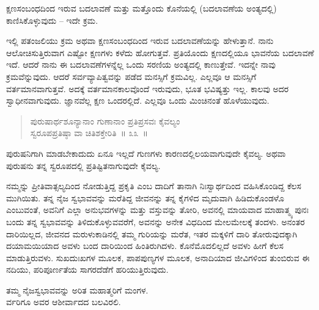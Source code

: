 ಕ್ಷಣಸಂಬಂಧದಿಂದ ಇರುವ ಬದಲಾವಣೆ ಮತ್ತು ಮತ್ತೊಂದು ಕೊನೆಯಲ್ಲಿ (ಬದಲಾವಣೆಯ ಅಂತ್ಯದಲ್ಲಿ) ಕಾಣಿಸಿಕೊಳ್ಳುವುದು – ಇದೇ ಕ್ರಮ. 

ಇಲ್ಲಿ ಪತಂಜಲಿಯು ಕ್ರಮ ಅಥವಾ ಕ್ಷಣಸಂಬಂಧದಿಂದ ಇರುವ ಬದಲಾವಣೆಯನ್ನು ಹೇಳುತ್ತಾನೆ. ನಾನು ಆಲೋಚಿಸುತ್ತಿರುವಾಗ ಎಷ್ಟೋ ಕ್ಷಣಗಳು ಕಳೆದು ಹೋಗುತ್ತವೆ. ಪ್ರತಿಯೊಂದು ಕ್ಷಣದಲ್ಲಿಯೂ ಭಾವನೆಯ ಬದಲಾವಣೆ ಇದೆ. ಆದರೆ ನಾನು ಈ ಬದಲಾವಣೆಗಳನ್ನೆಲ್ಲ ಒಂದು ಸರಣಿಯ ಅಂತ್ಯದಲ್ಲಿ ಕಾಣುತ್ತೇವೆ. ಇದನ್ನೇ ನಾವು ಕ್ರಮವೆನ್ನುವುದು. ಆದರೆ ಸರ್ವವ್ಯಾಪಿತ್ವವನ್ನು ಪಡೆದ ಮನಸ್ಸಿಗೆ ಕ್ರಮವಿಲ್ಲ. ಎಲ್ಲವೂ ಆ ಮನಸ್ಸಿಗೆ ವರ್ತಮಾನವಾಗುತ್ತವೆ. ಅದಕ್ಕೆ ವರ್ತಮಾನಕಾಲವೊಂದೆ ಇರುವುದು, ಭೂತ ಭವಿಷ್ಯತ್ತು ಇಲ್ಲ. ಕಾಲವು ಅದರ ಸ್ವಾಧೀನವಾಗುವುದು. ಜ್ಞಾನವೆಲ್ಲ ಕ್ಷಣ ಒಂದರಲ್ಲಿದೆ. ಎಲ್ಲವೂ ಒಂದು ಮಿಂಚಿನಂತೆ ಹೊಳೆಯುವುದು.

\begin{verse}
ಪುರುಷಾರ್ಥಶೂನ್ಯಾನಾಂ ಗುಣಾನಾಂ ಪ್ರತಿಪ್ರಸವಃ ಕೈವಲ್ಯಂ \\ಸ್ವರೂಪಪ್ರತಿಷ್ಠಾ ವಾ ಚಿತಿಶಕ್ತೇರಿತಿ~॥ ೩೩~॥
\end{verse}

ಪುರುಷನಿಗಾಗಿ ಮಾಡಬೇಕಾದುದು ಏನೂ ಇಲ್ಲದೆ ಗುಣಗಳು ಕಾರಣದಲ್ಲಿಲಯವಾಗುವುದೇ ಕೈವಲ್ಯ. ಅಥವಾ ಪುರುಷನು ತನ್ನ ಸ್ವರೂಪದಲ್ಲಿ ಪ್ರತಿಷ್ಟಿತನಾಗುವುದೇ ಕೈವಲ್ಯ. 

ನಮ್ಮನ್ನು ಪ್ರೀತಿವಾತ್ಸಲ್ಯದಿಂದ ನೋಡುತ್ತಿದ್ದ ಪ್ರಕೃತಿ ಎಂಬ ದಾದಿಗೆ ತಾನಾಗಿ ನಿಃಸ್ವಾರ್ಥದಿಂದ ವಹಿಸಿಕೊಂಡಿದ್ದ ಕೆಲಸ ಮುಗಿಯಿತು. ತನ್ನ ನೈಜ ಸ್ವಭಾವವನ್ನು ಮರೆತಿದ್ದ ಜೀವನನ್ನು ತನ್ನ ಕೈಗಳಿದ ಮೃದುವಾಗಿ ಹಿಡಿದುಕೊಂಡಳೊ ಎಂಬುವಂತೆ, ಅವನಿಗೆ ಎಲ್ಲಾ ಅನುಭವಗಳನ್ನು ಮತ್ತು ವಸ್ತುವನ್ನು ತೋರಿ, ಅವನಲ್ಲಿ ಮಾಯವಾದ ಮಾಹಾತ್ಮ್ಯ ಪುನಃ ಬಂದು ತನ್ನ ಸ್ವಭಾವವನ್ನು ತಿಳಿದುಕೊಳ್ಳುವವರೆಗೆ, ಅವನನ್ನು ಅನೇಕ ವಿಧದಿಂದ ಮೇಲಮೇಲಕ್ಕೆ ತಂದಳು. ಅನಂತರ ದಾರಿಯಿಲ್ಲದ, ಜೀವನದ ಮರುಳುಕಾಡಿನಲ್ಲಿ ತಮ್ಮ ಗುರಿಯನ್ನು ಮರೆತ, ಇತರ ಮಕ್ಕಳಿಗೆ ದಾರಿ ತೋರುವುದಕ್ಕಾಗಿ ದಯಾಮಯಿಯಾದ ಅವಳು ಬಂದ ದಾರಿಯಿಂದ ಹಿಂತಿರುಗಿದಳು. ಕೊನೆಮೊದಲಿಲ್ಲದೆ ಅವಳು ಹೀಗೆ ಕೆಲಸ ಮಾಡುತ್ತಿರುವಳು. ಸುಖದುಃಖಗಳ ಮೂಲಕ, ಪಾಪಪುಣ್ಯಗಳ ಮೂಲಕ, ಅನಾದಿಯಾದ ಜೀವಿಗಳಿಂದ ತುಂಬಿರುವ ಈ ನದಿಯು, ಪರಿಪೂರ್ಣತೆಯ ಸಾಗರದೆಡೆಗೆ ಹರಿಯುತ್ತಿರುವುದು.

\begin{center}
ತಮ್ಮ ನೈಜಸ್ವಭಾವವನ್ನು ಅರಿತ ಮಹಾತ್ಮರಿಗೆ ಮಂಗಳ. \\ರ್ವರಿಗೂ ಅವರ ಆಶೀರ್ವಾದದ ಬಲವಿರಲಿ. 
\end{center}

